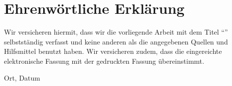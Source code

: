 \clearpage
\chapter*{Ehrenwörtliche Erklärung}


Wir versicheren hiermit, dass wir die vorliegende Arbeit mit dem Titel ``\textit{\DerTitelDerArbeit}'' selbstständig verfasst und
keine anderen als die angegebenen Quellen und Hilfsmittel benutzt haben. Wir versicheren zudem, dass die eingereichte elektronische Fassung mit der gedruckten Fassung übereinstimmt.

\vspace{3cm}
Ort, Datum \hfill \AutorinnenDerArbeit
